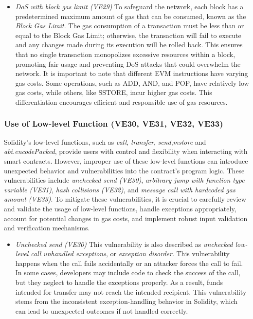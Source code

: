 \documentclass[manuscript,screen]{acmart}
\begin{document}
\begin{itemize}
  \item \textit{DoS with block gas limit (VE29)} To safeguard the network, each block has a predetermined maximum amount of gas that can be consumed, known as the \textit{Block Gas Limit}. The gas consumption of a transaction must be less than or equal to the Block Gas Limit; otherwise, the transaction will fail to execute and any changes made during its execution will be rolled back. This ensures that no single transaction monopolizes excessive resources within a block, promoting fair usage and preventing DoS attacks that could overwhelm the network. It is important to note that different EVM instructions have varying gas costs. Some operations, such as ADD, AND, and POP, have relatively low gas costs, while others, like SSTORE, incur higher gas costs. This differentiation encourages efficient and responsible use of gas resources. 
\end{itemize}

\subsubsection{Use of Low-level Function (VE30, VE31, VE32, VE33)} 
Solidity's low-level functions, such as \textit{call}, \textit{transfer}, \textit{send},\textit{mstore} and \textit{abi.encodePacked}, provide users with control and flexibility when interacting with smart contracts.  However, improper use of these low-level functions can introduce unexpected behavior and vulnerabilities into the contract's program logic. These vulnerabilities include \textit{unchecked send (VE30)}, \textit{arbitrary jump with function type variable (VE31)}, \textit{hash collisions (VE32)}, and \textit{message call with hardcoded gas amount (VE33)}. To mitigate these vulnerabilities, it is crucial to carefully review and validate the usage of low-level functions, handle exceptions appropriately, account for potential changes in gas costs, and implement robust input validation and verification mechanisms.

\begin{itemize}
  \item \textit{Unchecked send (VE30)} This vulnerability is also described as \textit{unchecked low-level call} \textit{unhandled exceptions}, or \textit{exception disorder}. This vulnerability happens when the call fails accidentally or an attacker forces the call to fail.
  In some cases, developers may include code to check the success of the call, but they neglect to handle the exceptions properly. As a result, funds intended for transfer may not reach the intended recipient. This vulnerability stems from the inconsistent exception-handling behavior in Solidity, which can lead to unexpected outcomes if not handled correctly. 
\end{itemize}
\end{document}
